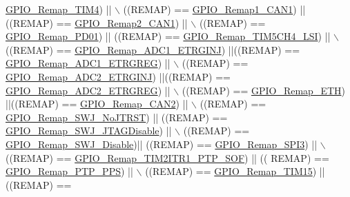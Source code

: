 \begin{DoxyCode}
      \hyperlink{group___g_p_i_o___remap__define_ga041b2f02b32895ce34bcd7499c9e873f}{GPIO\_Remap\_TIM4}) || \(\backslash\)
                              ((REMAP) == \hyperlink{group___g_p_i_o___remap__define_ga89ac81224968d8faf42475be664c1e09}{GPIO\_Remap1\_CAN1}) || ((REMAP) == 
      \hyperlink{group___g_p_i_o___remap__define_gad4f5b46cf24bed1563b22e6ecca3ebef}{GPIO\_Remap2\_CAN1}) || \(\backslash\)
                              ((REMAP) == \hyperlink{group___g_p_i_o___remap__define_gaeac44191de99d55a5fa03e29b74d5e59}{GPIO\_Remap\_PD01}) || ((REMAP) == 
      \hyperlink{group___g_p_i_o___remap__define_gad909488d0b7a0cfa1116a66e962e3c62}{GPIO\_Remap\_TIM5CH4\_LSI}) || \(\backslash\)
                              ((REMAP) == \hyperlink{group___g_p_i_o___remap__define_gaf79d966f49b64d3feb0ba9cc39294dac}{GPIO\_Remap\_ADC1\_ETRGINJ}) ||((REMAP) == 
      \hyperlink{group___g_p_i_o___remap__define_gab1d040cab5d9f16f362edc2e8b47a82a}{GPIO\_Remap\_ADC1\_ETRGREG}) || \(\backslash\)
                              ((REMAP) == \hyperlink{group___g_p_i_o___remap__define_gae00aaabeed54e805932ec6978acf000d}{GPIO\_Remap\_ADC2\_ETRGINJ}) ||((REMAP) == 
      \hyperlink{group___g_p_i_o___remap__define_gaa782a0c482f34507c82e4cd639bb747e}{GPIO\_Remap\_ADC2\_ETRGREG}) || \(\backslash\)
                              ((REMAP) == \hyperlink{group___g_p_i_o___remap__define_gaf578688bb4d1a17fb3a103946e7c2eb7}{GPIO\_Remap\_ETH}) ||((REMAP) == 
      \hyperlink{group___g_p_i_o___remap__define_ga14c09a5050063b703fa07181afc56ee6}{GPIO\_Remap\_CAN2}) || \(\backslash\)
                              ((REMAP) == \hyperlink{group___g_p_i_o___remap__define_ga81009ef35f7f039365291cf4f6fc0c5b}{GPIO\_Remap\_SWJ\_NoJTRST}) || ((REMAP) == 
      \hyperlink{group___g_p_i_o___remap__define_ga25fb8c789334694861444e48f486879d}{GPIO\_Remap\_SWJ\_JTAGDisable}) || \(\backslash\)
                              ((REMAP) == \hyperlink{group___g_p_i_o___remap__define_gaf4832412d0ba344bb9147142cfcda828}{GPIO\_Remap\_SWJ\_Disable})|| ((REMAP) == 
      \hyperlink{group___g_p_i_o___remap__define_gac7fd74244a9d53ca02cc86bb6543a689}{GPIO\_Remap\_SPI3}) || \(\backslash\)
                              ((REMAP) == \hyperlink{group___g_p_i_o___remap__define_ga0dc4bec540b9372479e63295fe68ac17}{GPIO\_Remap\_TIM2ITR1\_PTP\_SOF}) || ((
      REMAP) == \hyperlink{group___g_p_i_o___remap__define_ga3e9d7808d1e50393afde08e4a45d18aa}{GPIO\_Remap\_PTP\_PPS}) || \(\backslash\)
                              ((REMAP) == \hyperlink{group___g_p_i_o___remap__define_gaead5c447875e8b384945424845452b82}{GPIO\_Remap\_TIM15}) || ((REMAP) == 

\end{DoxyCode}
